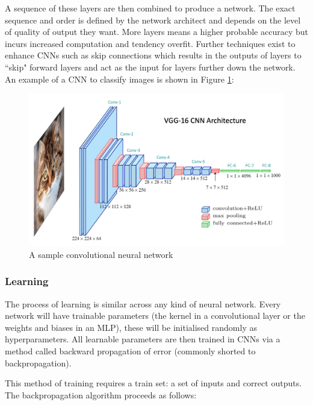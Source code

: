 A sequence of these layers are then combined to produce a network. The exact sequence and order is defined by the network architect and depends on the level of quality of output they want. More layers means a higher probable accuracy but incurs increased computation and tendency overfit. Further techniques exist to enhance CNNs such as skip connections which results in the outputs of layers to ``skip" forward layers and act as the input for layers further down the network. An example of a CNN to classify images is shown in Figure \ref{fig:sample-cnn}:

\begin{figure}[h]
    \centering
    \includegraphics[width=0.5\linewidth]{dissertation//figures/sample-cnn.png}
    \caption{A sample convolutional neural network\cite{kromydas2023convolutional}}
    \label{fig:sample-cnn}
\end{figure}

\subsubsection{Learning}

The process of learning is similar across any kind of neural network. Every network will have trainable parameters (the kernel in a convolutional layer or the weights and biases in an MLP), these will be initialised randomly as hyperparameters. All learnable parameters are then trained in CNNs via a method called backward propagation of error (commonly shorted to backpropagation)\cite{rojas2013neural}.

This method of training requires a train set: a set of inputs and correct outputs. The backpropagation algorithm proceeds as follows:

